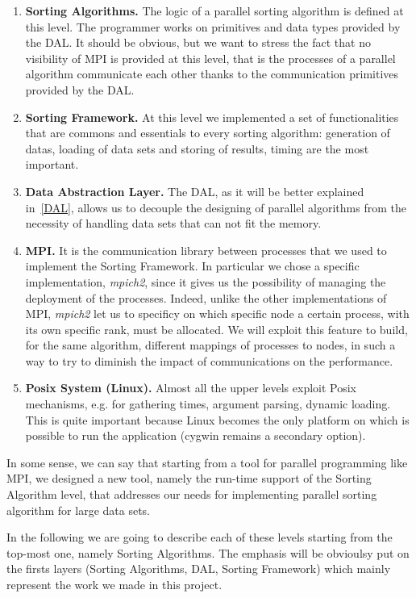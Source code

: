 \begin{enumerate}
\item \textbf{Sorting Algorithms.} The logic of a parallel sorting algorithm is defined at this level. The programmer works on primitives and data types provided by the DAL. It should be obvious, but we want to stress the fact that no visibility of MPI is provided at this level, that is the processes of a parallel algorithm communicate each other thanks to the communication primitives provided by the DAL.  
\item \textbf{Sorting Framework.} At this level we implemented a set of functionalities that are commons and essentials to every sorting algorithm: generation of datas, loading of data sets and storing of results, timing are the most important. 
\item \textbf{Data Abstraction Layer.} The DAL, as it will be better explained in~\ref{DAL}, allows us to decouple the designing of parallel algorithms from the necessity of handling data sets that can not fit the memory. 
\item \textbf{MPI.} It is the communication library between processes that we used to implement the Sorting Framework. In particular we chose a specific implementation, \textit{mpich2}, since it gives us the possibility of managing the deployment of the processes. Indeed, unlike the other implementations of MPI, \textit{mpich2} let us to specificy on which specific node a certain process, with its own specific rank, must be allocated. We will exploit this feature to build, for the same algorithm, different mappings of processes to nodes, in such a way to try to diminish the impact of communications on the performance. 
\item \textbf{Posix System (Linux).} Almost all the upper levels exploit Posix mechanisms, e.g. for gathering times, argument parsing, dynamic loading. This is quite important because Linux becomes the only platform on which is possible to run the application (cygwin remains a secondary option). 
\end{enumerate}
In some sense, we can say that starting from a tool for parallel programming like MPI, we designed a new tool, namely the run-time support of the Sorting Algorithm level, that addresses our needs for implementing parallel sorting algorithm for large data sets. 

In the following we are going to describe each of these levels starting from the top-most one, namely Sorting Algorithms. The emphasis will be obvioulsy put on the firsts layers (Sorting Algorithms, DAL, Sorting Framework) which mainly represent the work we made in this project.

